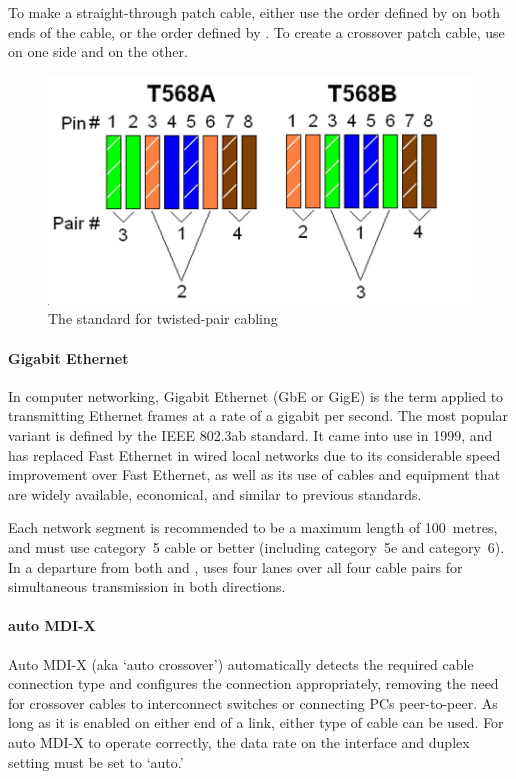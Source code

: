 To make a straight-through patch cable, either use the order defined by  on both ends of the cable, or the order defined by .
To create a crossover patch cable, use  on one side and  on the other.

\begin{figure}
\centering
\includegraphics[width=.7\textwidth]{images/physical/t568.jpeg}
\caption{The  standard for twisted-pair cabling}
\label{fig:t568}
\end{figure}


\paragraph{Gigabit Ethernet}
In computer networking, Gigabit Ethernet (GbE or GigE) is the term applied to transmitting Ethernet frames at a rate of a gigabit per second.
The most popular variant  is defined by the \acs{IEEE} 802.3ab standard.
It came into use in 1999, and has replaced Fast Ethernet in wired local networks due to its considerable speed improvement over Fast Ethernet, as well as its use of cables and equipment that are widely available, economical, and similar to previous standards.

Each  network segment is recommended to be a maximum length of 100~metres, and must use category~5 cable or better (including category~5e and category~6).
In a departure from both  and ,  uses four lanes over all four cable pairs for simultaneous transmission in both directions.

\paragraph{auto \acs{MDI-X}}
Auto \acs{MDI-X} (aka `auto crossover') automatically detects the required cable connection type and configures the connection appropriately, removing the need for crossover cables to interconnect switches or connecting \acsp{PC} peer-to-peer.
As long as it is enabled on either end of a link, either type of cable can be used.
For auto \acs{MDI-X} to operate correctly, the data rate on the interface and duplex setting must be set to `auto.'

